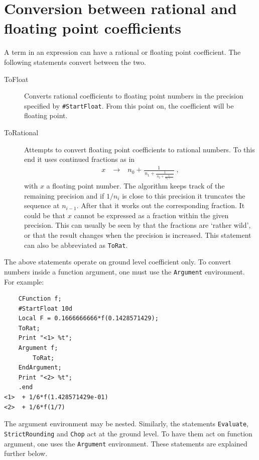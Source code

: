 \section{Conversion between rational and floating point coefficients}
A term in an expression can have a rational or floating point coefficient. 
The following statements convert between the two.
\begin{description}
\item[ToFloat] Converts rational coefficients to 
floating point numbers in the precision specified by \texttt{\#StartFloat}. 
From this point on, the coefficient will be floating point. 
\item[ToRational] Attempts to convert floating point coefficients to 
rational numbers. To this end it uses continued fractions as in
\begin{eqnarray}
	x & \;\rightarrow\; & n_0 + \frac{1}{\,n_1 + \frac{1}{\,n_2 + \frac{1}{\,n_3 + \cdots}}}\;,
	\nonumber
\end{eqnarray}
with $x$ a floating point number. The algorithm keeps track of the 
remaining precision and if $1/n_i$ is close to this precision it truncates 
the sequence at $n_{i-1}$. After that it works out the corresponding fraction. 
It could be that $x$ cannot be expressed as a fraction within the given precision. 
This can usually be seen by that the fractions are `rather wild', or that 
the result changes when the precision is increased. This statement can also 
be abbreviated as \texttt{ToRat}.
\end{description}

The above statements operate on ground level coefficient only. To convert numbers 
inside a function argument, one must use the \texttt{Argument} environment. 
For example: 
\begin{verbatim}
    CFunction f;
    #StartFloat 10d
    Local F = 0.1666666666*f(0.1428571429);
    ToRat;
    Print "<1> %t";
    Argument f;
        ToRat;
    EndArgument;
    Print "<2> %t";
    .end
<1>  + 1/6*f(1.428571429e-01)
<2>  + 1/6*f(1/7)
\end{verbatim}
The argument environment may be nested.
Similarly, the statements \texttt{Evaluate}, \texttt{StrictRounding} and \texttt{Chop} act at
the ground level. To have them act on function argument, one uses the \texttt{Argument} environment.
These statements are explained further below. 

